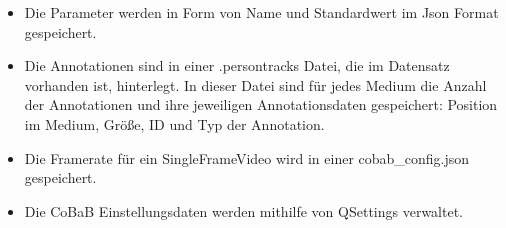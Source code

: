 \begin{itemize}
\item Die Parameter werden in Form von Name und Standardwert im Json Format gespeichert.
\item Die Annotationen sind in einer .persontracks Datei, die im Datensatz vorhanden ist, hinterlegt. In dieser Datei sind für jedes Medium die Anzahl der Annotationen und ihre jeweiligen Annotationsdaten gespeichert: Position im Medium, Größe, ID und Typ der Annotation.
\item Die Framerate für ein SingleFrameVideo wird in einer cobab\_config.json gespeichert.
\item Die CoBaB Einstellungsdaten werden mithilfe von QSettings verwaltet.
\end{itemize}